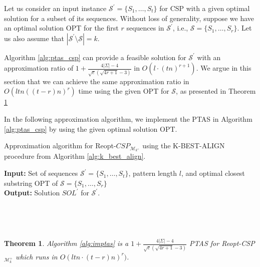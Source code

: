 \documentclass[journal]{acm_proc_article-sp}
\newtheorem{theorem}{Theorem}
\def\Sp{\ensuremath{\mathcal{S}^\prime}\xspace}
\begin{document}
Let us consider an input instance $\mathcal{S^\prime} = \{S_1, \ldots, S_t \}$ for CSP with a given optimal solution for a subset of its sequences. Without loss of generality, suppose we have an optimal solution OPT for the first $r$ sequences in $\mathcal{S}^\prime$, i.e., $\mathcal{S} = \{S_1, \ldots, S_r\}$. Let us also assume that $|\mathcal{S^\prime} \setminus \mathcal{S}| =k$.

Algorithm \ref{alg:ptas_csp} can provide a feasible solution for \Sp with an approximation ratio of  $1 + \frac{4|\Sigma| - 4}{\sqrt{e} (\sqrt{4r+1}-3)} $ in $O(l\cdot(tn)^{r+1})$. We argue in this section that we can achieve the same approximation ratio in $O(ltn((t-r)n)^{r})$ time using the given OPT for $\mathcal{S}$, as presented in Theorem \ref{thm:imptas}

 
In the following approximation algorithm, we implement the PTAS in Algorithm \ref{alg:ptas_csp} by using the given optimal solution OPT.

\begin{algorithm}
\caption{Approximation algorithm for Reopt-$CSP_{\mathcal{M}_{k^+}}$ using the K-BEST-ALIGN procedure from Algorithm \ref{alg:k_best_align}.}
\label{alg:imptas}
\noindent \textbf{Input: } Set of sequences $\mathcal{S}^\prime = \{S_1, \ldots, S_t\}$, pattern length $l$, and optimal closest substring OPT of $\mathcal{S} = \{S_1, \ldots, S_r\}$ \\
\textbf{Output:}  Solution $SOL^\prime$ for $\mathcal{S}^\prime$.\\

\begin{algorithmic}[1]
 \\


\EndIf
\EndFor \\

\Else{}
\EndIf
\end{algorithmic} 
\end{algorithm}

\begin{theorem}
\label{thm:imptas}
Algorithm \ref{alg:imptas} is a $1 + \frac{4|\Sigma| - 4}{\sqrt{e} (\sqrt{4r+1}-3)} $ PTAS for  Reopt-CSP$_{\mathcal{M}_k^+}$  which runs in $O(ltn\cdot (t-r)n)^{r})$.
\end{theorem} \vspace{3pt}
\end{document}
